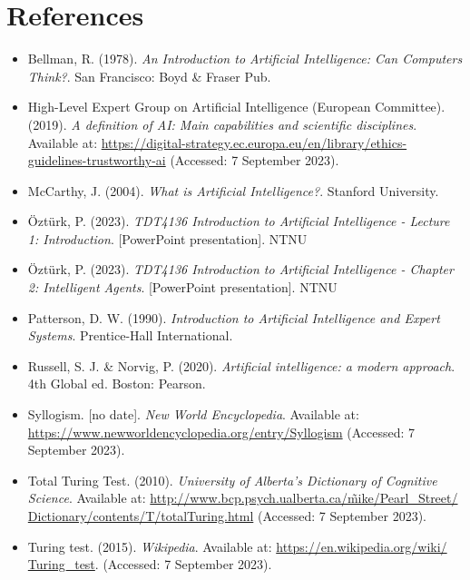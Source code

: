 \documentclass{article}
\begin{document}
\section*{References}
\begin{itemize}
    \item {Bellman, R. (1978). \textit{An Introduction to Artificial Intelligence: Can Computers Think?}. San Francisco: Boyd \& Fraser Pub.}
    \item{High-Level Expert Group on Artificial Intelligence (European Committee). (2019). \textit{A definition of AI: Main capabilities and scientific disciplines}. Available at: \href{https://digital-strategy.ec.europa.eu/en/library/ethics-guidelines-trustworthy-ai}{https://digital-strategy.ec.europa.eu/en/library/ethics-guidelines-trustworthy-ai} (Accessed: 7 September 2023).}
    \item{McCarthy, J. (2004). \textit{What is Artificial Intelligence?}. Stanford University.}
    \item{Öztürk, P. (2023). \textit{TDT4136 Introduction to Artificial Intelligence - Lecture 1: Introduction}. [PowerPoint presentation]. NTNU}
    \item{Öztürk, P. (2023). \textit{TDT4136 Introduction to Artificial Intelligence - Chapter 2: Intelligent Agents}. [PowerPoint presentation]. NTNU}
    \item{Patterson, D. W. (1990). \textit{Introduction to Artificial Intelligence and Expert Systems}. Prentice-Hall International.}
    \item{Russell, S. J. \& Norvig, P. (2020). \textit{Artificial intelligence: a modern approach}. 4th Global ed. Boston: Pearson.}
    \item{Syllogism. [no date]. \textit{New World Encyclopedia}. Available at:\\ \href{https://www.newworldencyclopedia.org/entry/Syllogism}{https://www.newworldencyclopedia.org/entry/Syllogism} (Accessed: 7 September 2023).}
    \item{Total Turing Test. (2010). \textit{University of Alberta's Dictionary of Cognitive Science}. Available at: \href{http://www.bcp.psych.ualberta.ca/~mike/Pearl_Street/Dictionary/contents/T/totalTuring.html}{http://www.bcp.psych.ualberta.ca/\~mike/Pearl\_Street/\\Dictionary/contents/T/totalTuring.html} (Accessed: 7 September 2023).}
    \item{Turing test. (2015). \textit{Wikipedia}. Available at: \href{https://en.wikipedia.org/wiki/Turing_test}{ https://en.wikipedia.org/wiki/\\Turing\_test}. (Accessed: 7 September 2023).}
\end{itemize}
\end{document}
